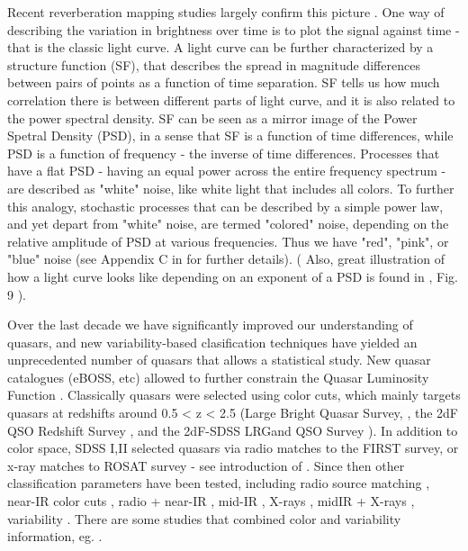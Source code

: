 \documentclass[modern]{aastex62}
\begin{document}
Recent reverberation mapping studies largely confirm this picture \citep{sun2015}. One way of describing the variation in brightness over time is to plot the signal against time - that is the classic light curve.  A light curve can be further characterized by a structure function (SF), that describes the spread in magnitude differences between pairs of points as a function of time separation. SF tells us how much correlation there is between different parts of light curve, and it is also related to the power spectral density. SF can be seen as a mirror image of the Power Spetral Density (PSD), in a sense that SF is a function of time differences, while PSD is a function of frequency - the inverse of  time differences. Processes that have a flat PSD - having an equal power across the entire frequency spectrum -  are described as "white" noise, like white light that includes all colors. To further this analogy, stochastic processes that can be described by a simple power law, and yet depart from "white" noise, are termed  "colored" noise, depending on the relative amplitude of PSD at various frequencies. Thus we have "red", "pink", or "blue" noise   (see Appendix  C in \cite{kasliwal2017} for further details). ( Also, great illustration of how a light curve looks like depending on an exponent of a PSD is found in \cite{macleod2010}, Fig. 9 ). 


Over the last decade we have significantly improved our understanding of quasars, and new variability-based clasification techniques \citep{fan2001, richards2006, kozlowski2010, palanque2011, macleod2011, graham2014, alsayyad2016, ruan2017} have yielded an unprecedented number of quasars that allows a statistical study. New quasar catalogues (eBOSS, etc) allowed  to further constrain the Quasar Luminosity Function \citep{ross2013, myers2015, palanque2016}. Classically quasars were selected using color cuts,  which mainly targets quasars at redshifts around 0.5 < z < 2.5 (Large Bright Quasar Survey, \cite{hewett1995}, the 2dF QSO Redshift Survey \cite{croom2004}, and the 2dF-SDSS LRGand QSO Survey \cite{croom2009}).  In addition to color space, SDSS I,II selected quasars via radio matches to the FIRST survey, or x-ray matches to ROSAT survey  - see introduction of \citep{myers2015}. Since then other classification parameters have been tested, including radio source matching \citep{mcgreer2009}, near-IR color cuts \citep{banerji2012},  radio + near-IR \citep{glikman2012}, mid-IR \citep{stern2005, richards2009a, stern2012}, X-rays \citep{trichas2012},  midIR + X-rays \citep{lacy2004, hickox2007, hickox2009}, variability \citep{schmidt2010, butler2011, macleod2011, palanque2011}. There are some studies that combined color and variability information, eg. \cite{tie2017, peters2015, sesar2007}. 
\end{document}
